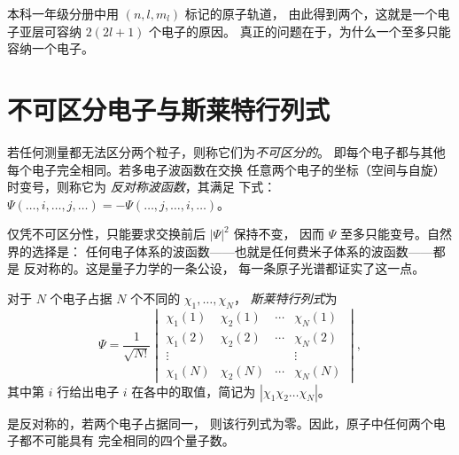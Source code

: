 本科一年级分册中用 $(n, l, m_l)$ 标记的原子轨道，
由此得到两个，这就是一个电子亚层可容纳 $2(2l+1)$ 个电子的原因。
真正的问题在于，为什么一个至多只能容纳一个电子。

\section{不可区分电子与斯莱特行列式}

\begin{definition}\label{def:b3:many-electron-atoms:indistinguishable}
若任何测量都无法区分两个粒子，则称它们为\emph{不可区分的}。
即每个电子都与其他每个电子完全相同。若多电子波函数在交换
任意两个电子的坐标（空间与自旋）时变号，则称它为
\emph{反对称波函数}，其满足
下式：
$\Psi(\dots,i,\dots,j,\dots) = -\Psi(\dots,j,\dots,i,\dots)$。
\end{definition}

仅凭不可区分性，只能要求交换前后 $|\Psi|^2$ 保持不变，
因而 $\Psi$ 至多只能变号。自然界的选择是：
任何电子体系的波函数——也就是任何费米子体系的波函数——都是
反对称的。这是量子力学的一条公设，
每一条原子光谱都证实了这一点。

\begin{definition}[斯莱特行列式]\label{def:b3:many-electron-atoms:slater}
对于 $N$ 个电子占据 $N$ 个不同的 $\chi_1, \dots, \chi_N$，
\emph{斯莱特行列式}为
\[
\Psi = \frac{1}{\sqrt{N!}}\begin{vmatrix}
\chi_1(1) & \chi_2(1) & \cdots & \chi_N(1)\\
\chi_1(2) & \chi_2(2) & \cdots & \chi_N(2)\\
\vdots & & & \vdots\\
\chi_1(N) & \chi_2(N) & \cdots & \chi_N(N)
\end{vmatrix},
\]
其中第 $i$ 行给出电子 $i$ 在各中的取值，简记为
$|\chi_1\chi_2\dots\chi_N|$。
\end{definition}

\begin{theorem}[泡利原理]\label{thm:b3:many-electron-atoms:pauli}
是反对称的，若两个电子占据同一，
则该行列式为零。因此，原子中任何两个电子都不可能具有
完全相同的四个量子数。
\end{theorem}

